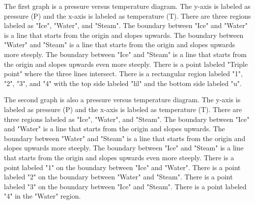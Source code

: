 The first graph is a pressure versus temperature diagram. The y-axis is labeled as pressure (P) and the x-axis is labeled as temperature (T). There are three regions labeled as "Ice", "Water", and "Steam". The boundary between "Ice" and "Water" is a line that starts from the origin and slopes upwards. The boundary between "Water" and "Steam" is a line that starts from the origin and slopes upwards more steeply. The boundary between "Ice" and "Steam" is a line that starts from the origin and slopes upwards even more steeply. There is a point labeled "Triple point" where the three lines intersect. There is a rectangular region labeled "1", "2", "3", and "4" with the top side labeled "lil" and the bottom side labeled "u".

The second graph is also a pressure versus temperature diagram. The y-axis is labeled as pressure (P) and the x-axis is labeled as temperature (T). There are three regions labeled as "Ice", "Water", and "Steam". The boundary between "Ice" and "Water" is a line that starts from the origin and slopes upwards. The boundary between "Water" and "Steam" is a line that starts from the origin and slopes upwards more steeply. The boundary between "Ice" and "Steam" is a line that starts from the origin and slopes upwards even more steeply. There is a point labeled "1" on the boundary between "Ice" and "Water". There is a point labeled "2" on the boundary between "Water" and "Steam". There is a point labeled "3" on the boundary between "Ice" and "Steam". There is a point labeled "4" in the "Water" region.